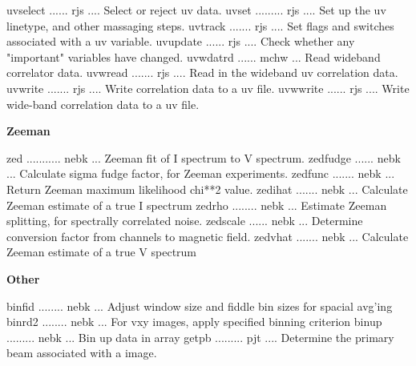{\eightpoint\begintt
uvselect ...... rjs .... Select or reject uv data.
uvset ......... rjs .... Set up the uv linetype, and other massaging steps.
uvtrack ....... rjs .... Set flags and switches associated with a uv variable.
uvupdate ...... rjs .... Check whether any "important" variables have changed.
uvwdatrd ...... mchw ... Read wideband correlator data.
\endtt}
{\eightpoint\begintt
uvwread ....... rjs .... Read in the wideband uv correlation data.
uvwrite ....... rjs .... Write correlation data to a uv file.
uvwwrite ...... rjs .... Write wide-band correlation data to a uv file.
\endtt}
\par\centerline{\bf Zeeman}
{\eightpoint\begintt
zed ........... nebk ... Zeeman fit of I spectrum to V spectrum.
zedfudge ...... nebk ... Calculate sigma fudge factor, for Zeeman experiments.
zedfunc ....... nebk ... Return Zeeman maximum likelihood chi**2 value.
zedihat ....... nebk ... Calculate Zeeman estimate of a true I spectrum
zedrho ........ nebk ... Estimate Zeeman splitting, for spectrally correlated noise.
\endtt}
{\eightpoint\begintt
zedscale ...... nebk ... Determine conversion factor from channels to magnetic field.
zedvhat ....... nebk ... Calculate Zeeman estimate of a true V spectrum
\endtt}
\par\centerline{\bf Other}
{\eightpoint\begintt
binfid ........ nebk ... Adjust window size and fiddle bin sizes for spacial avg'ing
binrd2 ........ nebk ... For vxy images, apply specified binning criterion
binup ......... nebk ... Bin up data in array
getpb ......... pjt .... Determine the primary beam associated with a image.
\endtt}
